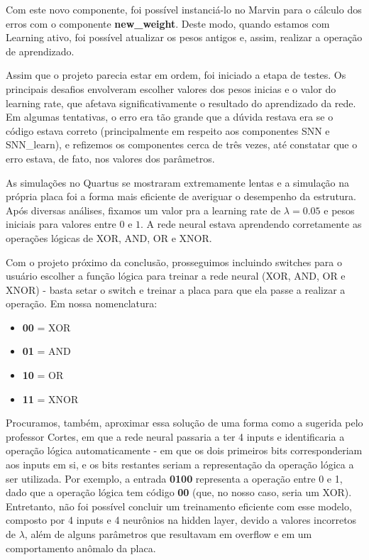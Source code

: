     Com este novo componente, foi possível instanciá-lo no Marvin para o cálculo dos erros com o componente \textbf{new\_weight}. Deste modo, quando estamos com Learning ativo, foi possível atualizar os pesos antigos e, assim, realizar a operação de aprendizado.

    Assim que o projeto parecia estar em ordem, foi iniciado a etapa de testes. Os principais desafios envolveram escolher valores dos pesos inicias e o valor do learning rate, que afetava significativamente o resultado do aprendizado da rede. Em algumas tentativas, o erro era tão grande que a dúvida restava era se o código estava correto (principalmente em respeito aos componentes SNN e SNN\_learn), e refizemos os componentes cerca de três vezes, até constatar que o erro estava, de fato, nos valores dos parâmetros.

    As simulações no Quartus se mostraram extremamente lentas e a simulação na própria placa foi a forma mais eficiente de averiguar o desempenho da estrutura. Após diversas análises, fixamos um valor pra a learning rate de $\lambda = 0.05$ e pesos iniciais para valores entre $0$ e $1$. A rede neural estava aprendendo corretamente as operações lógicas de XOR, AND, OR e XNOR.

    Com o projeto próximo da conclusão, prosseguimos incluindo switches para o usuário escolher a função lógica para treinar a rede neural (XOR, AND, OR e XNOR) - basta setar o switch e treinar a placa para que ela passe a realizar a operação. Em nossa nomenclatura:

    \begin{itemize}
        \item \textbf{00} = XOR
        \item \textbf{01} = AND
        \item \textbf{10} = OR
        \item \textbf{11} = XNOR
    \end{itemize}

    Procuramos, também, aproximar essa solução de uma forma como a sugerida pelo professor Cortes, em que a rede neural passaria a ter 4 inputs e identificaria a operação lógica automaticamente - em que os dois primeiros bits corresponderiam aos inputs em si, e os bits restantes seriam a representação da operação lógica a ser utilizada. Por exemplo, a entrada \textbf{0100} representa a operação entre 0 e 1, dado que a operação lógica tem código \textbf{00} (que, no nosso caso, seria um XOR). Entretanto, não foi possível concluir um treinamento eficiente com esse modelo, composto por 4 inputs e 4 neurônios na hidden layer, devido a valores incorretos de $\lambda$, além de alguns parâmetros que resultavam em overflow e em um comportamento anômalo da placa. 

